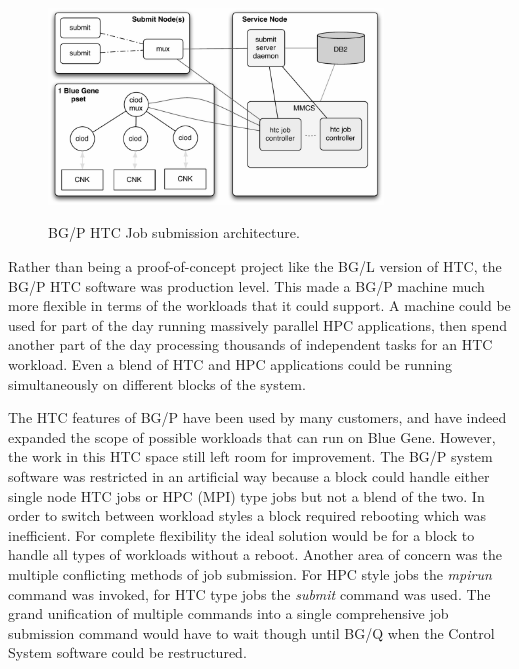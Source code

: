 \begin{figure}[!b]
    \centering
    \caption{BG/P HTC Job submission architecture.}
    \includegraphics[width=3.5in]{bgp_htc_architecture}
    \label{fig:htcjobsubmission}
\end{figure}

Rather than being a proof-of-concept project like the BG/L version of HTC, the BG/P HTC software was
production level. This made a BG/P machine much more flexible in terms of the workloads that it could support.
A machine could be used for part of the day running massively parallel HPC applications, then spend another
part of the day processing thousands of independent tasks for an HTC workload. Even a blend of HTC and HPC
applications could be running simultaneously on different blocks of the system.

The HTC features of BG/P have been used by many customers, and have indeed expanded the scope of possible
workloads that can run on Blue Gene. However, the work in this HTC space still left room for improvement. The
BG/P system software was restricted in an artificial way because a block could handle either single node HTC jobs or
HPC (MPI) type jobs but not a blend of the two. In order to switch between workload styles a block required
rebooting which was inefficient. For complete flexibility the ideal solution would be for a block to handle
all types of workloads without a reboot. Another area of concern was the multiple conflicting methods of job
submission. For HPC style jobs the \emph{mpirun} command was invoked, for HTC type jobs the \emph{submit}
command was used. The grand unification of multiple commands into a single comprehensive job submission
command would have to wait though until BG/Q when the Control System software could be restructured. 
